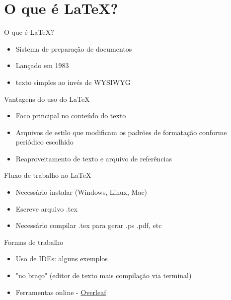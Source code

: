 \documentclass[aspectratio=169,xcolor=dvipsnames]{beamer}
\begin{document}
\section{O que é \LaTeX?}

\begin{frame}{O que é \LaTeX?}
    \begin{itemize}
        \item Sistema de preparação de documentos 
        \item Lançado em 1983
        \item texto simples ao invés de WYSIWYG  
    \end{itemize}
\end{frame}

\begin{frame}{Vantagens do uso do \LaTeX}
    \begin{itemize}
        \item Foco principal no conteúdo do texto
        \item Arquivos de estilo que modificam os padrões de formatação conforme periódico escolhido
        \item Reaproveitamento de texto e arquivo de referências 
    \end{itemize}
        
\end{frame}

\begin{frame}{Fluxo de trabalho no \LaTeX}
    \begin{itemize}
        \item Necessário instalar (Windows, Linux, Mac)
        \item Escreve arquivo .tex 
        \item Necessário compilar .tex para gerar .ps .pdf, etc
    \end{itemize}
\end{frame}

\begin{frame}{Formas de trabalho}
    \begin{itemize}
        \item Uso de IDEs: \href{https://beebom.com/best-latex-editors/}{alguns exemplos}
        \item "no braço" (editor de texto mais compilação via terminal)
        \item Ferramentas online - \href{http://www.overleaf.com/}{Overleaf}
    \end{itemize}
\end{frame}
\end{document}
